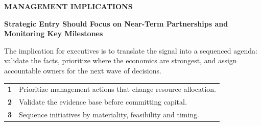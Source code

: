 \documentclass[10pt,a4paper]{article}
\begin{document}
\clearpage
{\textcolor{BOBlue}{\scriptsize\bfseries MANAGEMENT IMPLICATIONS}}\par\vspace{-1pt}
{\Large\sffamily\bfseries\color{BONavy} Strategic Entry Should Focus on Near-Term Partnerships and Monitoring Key Milestones}\par\vspace{4pt}
{\small The implication for executives is to translate the signal into a sequenced agenda: validate the facts, prioritize where the economics are strongest, and assign accountable owners for the next wave of decisions.}\par
\begin{tabularx}{\linewidth}{p{10mm}Y}
\textcolor{BOBlue}{\bfseries 1} & Prioritize management actions that change resource allocation. \\[5pt]
\textcolor{BOBlue}{\bfseries 2} & Validate the evidence base before committing capital. \\[5pt]
\textcolor{BOBlue}{\bfseries 3} & Sequence initiatives by materiality, feasibility and timing. \\[5pt]
\end{tabularx}
\vspace{6pt}

\vspace{6pt}{\textcolor{BOBlue}{\scriptsize\bfseries EXECUTION ROADMAP}}\par
\begin{center}
\end{center}
\end{document}
